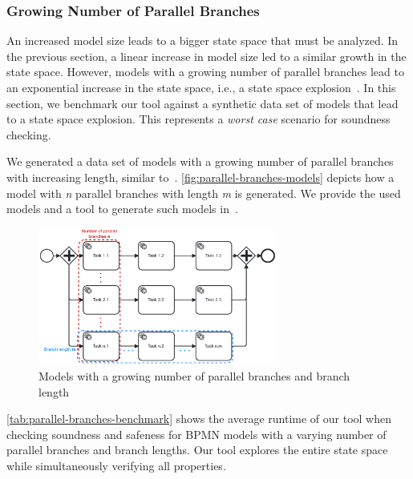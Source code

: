 \documentclass[runningheads]{llncs}
\begin{document}
\subsubsection{Growing Number of Parallel Branches}
An increased model size leads to a bigger state space that must be analyzed.
In the previous section, a linear increase in model size led to a similar growth in the state space.
However, models with a growing number of parallel branches lead to an exponential increase in the state space, i.e., a state space explosion~\cite{valmariStateExplosionProblem1998}.
In this section, we benchmark our tool against a synthetic data set of models that lead to a state space explosion.
This represents a \textit{worst case} scenario for soundness checking.

We generated a data set of models with a growing number of parallel branches with increasing length, similar to~\cite{corradiniFormalApproachAnalysis2021}.
\autoref{fig:parallel-branches-models} depicts how a model with \textit{n} parallel branches with length \textit{m} is generated.
We provide the used models and a tool to generate such models in~\cite{noauthorgivenBPM2024Artifacts2024}.

\begin{figure}[ht]
	\centering
	\includegraphics[width=0.7\textwidth]{images/parallel-branches}
	\caption{Models with a growing number of parallel branches and branch length}
	\label{fig:parallel-branches-models}
\end{figure}

\autoref{tab:parallel-branches-benchmark} shows the average runtime of our tool when checking soundness and safeness for BPMN models with a varying number of parallel branches and branch lengths.
Our tool explores the entire state space while simultaneously verifying all properties.
\end{document}
